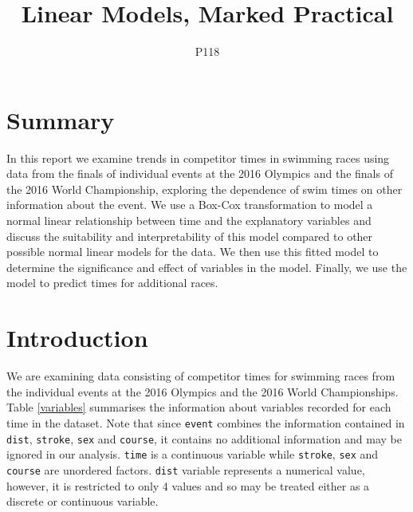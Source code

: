 \documentclass[a4paper,11pt]{article}
\title{Linear Models, Marked Practical}
\author{P118}
\begin{document}
\maketitle \thispagestyle{empty}
\newpage {}


\section{Summary}

In this report we examine trends in competitor times in swimming races using data from the finals of individual events at the 2016 Olympics and the finals of the 2016 World Championship, exploring the dependence of swim times on other information about the event. We use a Box-Cox transformation to model a normal linear relationship between time and the explanatory variables and discuss the suitability and interpretability of this model compared to other possible normal linear models for the data. We then use this fitted model to determine the significance and effect of variables in the model. Finally, we use the model to predict times for additional races.

\section{Introduction}

We are examining data consisting of competitor times for swimming races from the individual events at the 2016 Olympics and the 2016 World Championships. Table \ref{variables} summarises the information about variables recorded for each time in the dataset. Note that since \verb|event| combines the information contained in \verb|dist|, \verb|stroke|, \verb|sex| and \verb|course|, it contains no additional information and may be ignored in our analysis. \verb|time| is a continuous variable while \verb|stroke|, \verb|sex| and \verb|course| are unordered factors. \verb|dist| variable represents a numerical value, however, it is restricted to only 4 values and so may be treated either as a discrete or continuous variable.
\end{document}
